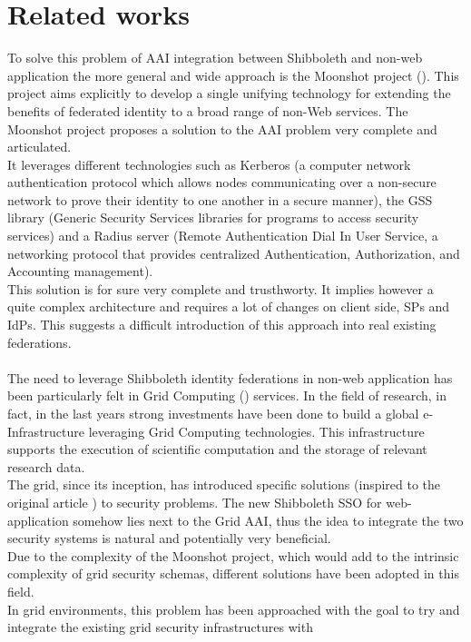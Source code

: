 \section{Related works}
To solve this problem of AAI integration between Shibboleth and non-web application the more general and wide approach is the Moonshot
project (\cite{Howlett-2010}).
This project aims explicitly to develop a single unifying technology for extending the benefits of federated identity to a broad range of
non-Web services.
The Moonshot project proposes a solution to the AAI problem very complete and articulated.\\
It leverages different technologies such as Kerberos (a computer network authentication protocol which allows nodes communicating over a
non-secure network to prove their identity to one another in a secure manner), the GSS library (Generic Security Services libraries for
programs to access security services) and a Radius server (Remote Authentication Dial In User Service, a networking protocol that provides
centralized Authentication, Authorization, and Accounting management).\\
This solution is for sure very complete and trusthworty.
It implies however a quite complex architecture and requires a lot of changes on client side, SPs and IdPs.
This suggests a difficult introduction of this approach into real existing federations.\\
\\
The need to leverage Shibboleth identity federations in non-web application has been particularly felt in Grid Computing
(\cite{Kesselman-1998}) services.
In the field of research, in fact, in the last years strong investments have been done to build a global e-Infrastructure leveraging Grid
Computing technologies.
This infrastructure supports the execution of scientific computation and the storage of relevant research data.\\
The grid, since its inception, has introduced specific solutions (inspired to the original article \cite{Foster-1998}) to security problems.
The new Shibboleth SSO for web-application somehow lies next to the Grid AAI, thus the idea to integrate the two security systems is natural
and potentially very beneficial.\\
Due to the complexity of the Moonshot project, which would add to the intrinsic complexity of grid security schemas, different solutions have
been adopted in this field.
\\
In grid environments, this problem has been approached with the goal to try and integrate the existing grid security infrastructures with
